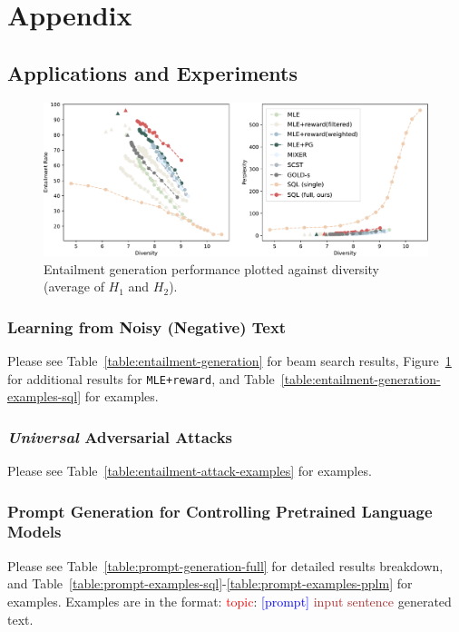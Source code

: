 

\section{Appendix}




\subsection{Applications and Experiments}

\begin{figure}
    \centering
    \includegraphics[width=0.86\linewidth]{figures/202101004-entailment-generation.all.pdf}
    \vspace{-4pt}
    \caption{Entailment generation performance plotted against diversity (average of $H_1$ and $H_2$).}
    \label{appendix-fig:entailment-generation}
    \vspace{-5pt}
\end{figure}

\subsubsection{Learning from Noisy (Negative) Text}
\label{appendix-subsubsec:experiments-noisy-data}
Please see Table~\ref{table:entailment-generation} for beam search results, Figure~\ref{appendix-fig:entailment-generation} for additional results for \texttt{MLE+reward}, and Table~\ref{table:entailment-generation-examples-sql} for examples.


\subsubsection{\textit{Universal} Adversarial Attacks}
Please see Table~\ref{table:entailment-attack-examples} for examples.

\subsubsection{Prompt Generation for Controlling Pretrained Language Models}
\label{appendix-subsubsec:experiments-prompt-generation}
Please see Table~\ref{table:prompt-generation-full} for detailed results breakdown, and Table~\ref{table:prompt-examples-sql}-\ref{table:prompt-examples-pplm} for examples. Examples are in the format: \textcolor{red}{topic}: \textcolor{blue}{[prompt]} \textcolor{brown}{input sentence} generated text.

